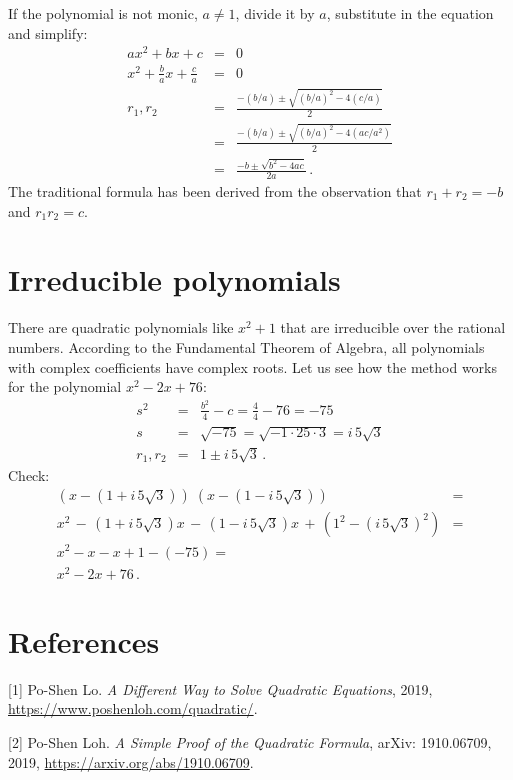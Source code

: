 \documentclass[12pt,a4paper]{article}
\begin{document}
If the polynomial is not monic, $a\neq 1$, divide it by $a$, substitute in the  equation and simplify:
\begin{eqnarray*}
ax^2+bx+c&=&0\\
x^2+\frac{b}{a}x+\frac{c}{a}&=&0\\
r_1,r_2&=&\frac{-(b/a)\pm\sqrt{(b/a)^2-4(c/a)}}{2}\\
&=&\frac{-(b/a)\pm\sqrt{(b/a)^2-4(ac/a^2)}}{2}\\
&=&\frac{-b\pm\sqrt{b^2-4ac}}{2a}\,.
\end{eqnarray*}
The traditional formula has been derived from the observation that $r_1+r_2=-b$ and $r_1r_2=c$.

\section{Irreducible polynomials}\label{s.irreducible}

There are quadratic polynomials like $x^2+1$ that are irreducible over the rational numbers. According to the Fundamental Theorem of Algebra, all polynomials with complex coefficients have complex roots. Let us see how the method works for the polynomial $x^2-2x+76$:
\begin{eqnarray*}
s^2&=&\frac{b^2}{4}-c=\frac{4}{4}-76=-75\\
s&=&\sqrt{-75}=\sqrt{-1\cdot 25\cdot 3}=i\,5\sqrt{3}\\
r_1,r_2&=&1\pm i\,5\sqrt{3}\,.
\end{eqnarray*}
Check:
\[
\renewcommand*{\arraystretch}{1.3}
\begin{array}{ll}
(x-(1+i\,5\sqrt{3}))\;(x-(1-i\,5\sqrt{3}))&=\\
x^2 \,-\, (1+i\,5\sqrt{3})x\,-\,(1-i\,5\sqrt{3})x\,+\,(1^2-(i\,5\sqrt{3})^2)&=\\
x^2 -x -x + 1 - (-75)=\\
x^2-2x+76\,.
\end{array}
\]

\section*{References}

[1] Po-Shen Lo. \textit{A Different Way to Solve Quadratic Equations}, 2019,\\
\url{https://www.poshenloh.com/quadratic/}.

[2] Po-Shen Loh. \textit{A Simple Proof of the Quadratic Formula}, arXiv: 1910.06709, 2019, \url{https://arxiv.org/abs/1910.06709}.
\end{document}
